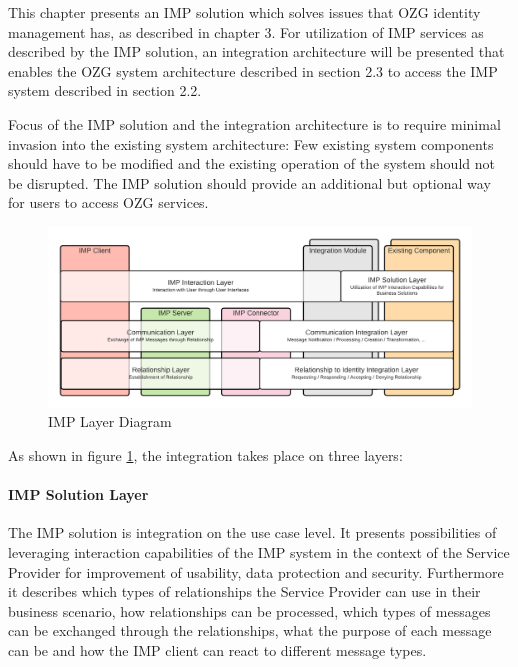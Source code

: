 This chapter presents an IMP solution which solves issues that OZG identity management has, as described in chapter 3. For utilization of IMP services as described by the IMP solution, an integration architecture will be presented that enables the OZG system architecture described in section 2.3 to access the IMP system described in section 2.2.

Focus of the IMP solution and the integration architecture is to require minimal invasion into the existing system architecture: Few existing system components should have to be modified and the existing operation of the system should not be disrupted. The IMP solution should provide an additional but optional way for users to access OZG services.

\begin{figure}[h]
    \centering
    \includegraphics[scale=0.6]{Diagrams/Integration Architecture 1/IMP Layer Diagram Integration.pdf}
    \caption{IMP Layer Diagram}
    \label{integration1:layer_diagram}
\end{figure}

As shown in figure \ref{integration1:layer_diagram}, the integration takes place on three layers:

\paragraph{IMP Solution Layer} 
The IMP solution is integration on the use case level. It presents possibilities of leveraging interaction capabilities of the IMP system in the context of the Service Provider for improvement of usability, data protection and security. Furthermore it describes which types of relationships the Service Provider can use in their business scenario, how relationships can be processed, which types of messages can be exchanged through the relationships, what the purpose of each message can be and how the IMP client can react to different message types.

